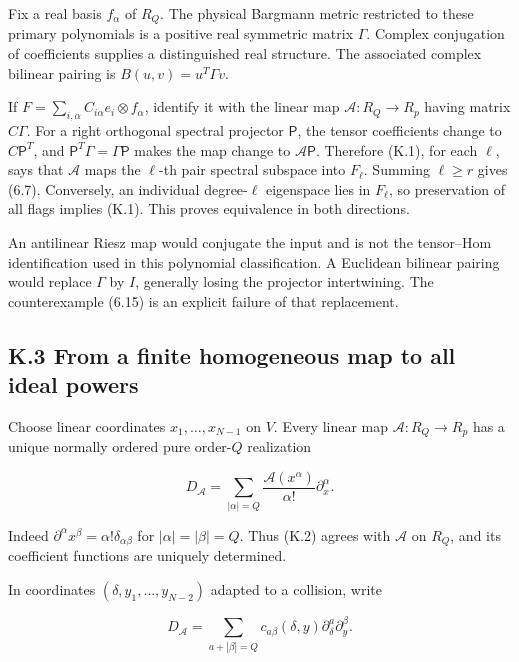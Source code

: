 Fix a real basis \(f_\alpha\) of \(R_Q\). The physical Bargmann metric restricted to these primary polynomials is a positive real symmetric matrix \(\Gamma\). Complex conjugation of coefficients supplies a distinguished real structure. The associated complex bilinear pairing is \(B(u,v)=u^T\Gamma v\).

If \(F=\sum_{i,\alpha}C_{i\alpha}e_i\otimes f_\alpha\), identify it with the linear map \(\mathcal A:R_Q\to R_p\) having matrix \(C\Gamma\). For a right orthogonal spectral projector \(\mathsf P\), the tensor coefficients change to \(C\mathsf P^T\), and \(\mathsf P^T\Gamma=\Gamma\mathsf P\) makes the map change to \(\mathcal A\mathsf P\). Therefore (K.1), for each \(\ell\), says that \(\mathcal A\) maps the \(\ell\)-th pair spectral subspace into \(F_\ell\). Summing \(\ell\ge r\) gives (6.7). Conversely, an individual degree-\(\ell\) eigenspace lies in \(F_\ell\), so preservation of all flags implies (K.1). This proves equivalence in both directions.

An antilinear Riesz map would conjugate the input and is not the tensor--Hom identification used in this polynomial classification. A Euclidean bilinear pairing would replace \(\Gamma\) by \(I\), generally losing the projector intertwining. The counterexample (6.15) is an explicit failure of that replacement.

\hypertarget{k.3-from-a-finite-homogeneous-map-to-all-ideal-powers}{%
\subsection{K.3 From a finite homogeneous map to all ideal powers}\label{k.3-from-a-finite-homogeneous-map-to-all-ideal-powers}}

Choose linear coordinates \(x_1,\ldots,x_{N-1}\) on \(V\). Every linear map \(\mathcal A:R_Q\to R_p\) has a unique normally ordered pure order-\(Q\) realization

\[
D_{\mathcal A}=\sum_{|\alpha|=Q}
\frac{\mathcal A(x^\alpha)}{\alpha!}\partial_x^\alpha.
\tag{K.2}
\]

Indeed \(\partial^\alpha x^\beta=\alpha!\delta_{\alpha\beta}\) for \(|\alpha|=|\beta|=Q\). Thus (K.2) agrees with \(\mathcal A\) on \(R_Q\), and its coefficient functions are uniquely determined.

In coordinates \((\delta,y_1,\ldots,y_{N-2})\) adapted to a collision, write

\[
D_{\mathcal A}=\sum_{a+|\beta|=Q}c_{a\beta}(\delta,y)
\partial_\delta^a\partial_y^\beta.
\tag{K.3}
\]

